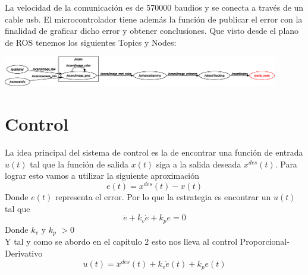 La velocidad de la comunicación es de 570000 baudios y se conecta a través de un cable usb. El microcontrolador tiene además
la función de publicar el error con la finalidad de graficar dicho error y obtener conclusiones. Que visto desde el plano
de ROS tenemos los siguientes Topics y Nodes:
\begin{center}
	\includegraphics[width=0.9\textwidth]{Contenido/Cuerpo/Capitulo5/Fig3.eps}
	\label{Fig4}
\end{center}




\section{Control}
La idea principal del sistema de control es la de encontrar una función de entrada $u(t)$ tal que la función de salida $x(t)$ siga a la
salida deseada $x^{des}(t)$. Para lograr esto vamos a utilizar la siguiente aproximación
\begin{equation}
	e(t) = x^{des}(t) - x(t)
\end{equation}
Donde $e(t)$ representa el error. Por lo que la estrategia es encontrar un $u(t)$ tal que
\begin{equation}
	\ddot{e} + k_v\dot{e} + k_pe = 0
\end{equation}
Donde $k_v$ y $k_p$ $> 0$\\
Y tal y como se abordo en el capitulo 2 esto nos lleva al control Proporcional-Derivativo
\begin{equation}
	u(t) = \ddot{x}^{des}(t) + k_v\dot{e}(t) + k_pe(t)
\end{equation}

